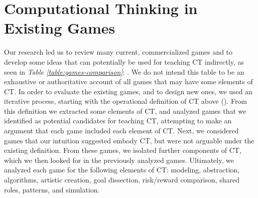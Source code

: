 \documentclass{acm_proc_article-sp}
\begin{document}
\section{Computational Thinking in Existing Games}
\label{sec:CT_current_games}
Our research led us to review many current, commercialized games and to develop some ideas that can potentially be used for teaching CT indirectly, as seen in \textit{Table \ref{table:games-comparison}}: \textit{}.
We do not intend this table to be an exhaustive or authoritative account of all games that may have some elements of CT.
In order to evaluate the existing games, and to design new ones, we used an iterative process, starting with the operational definition of CT above (\cite{operationalct}).
From this definition we extracted some elements of CT, and analyzed games that we identified as potential candidates for teaching CT, attempting to make an argument that each game included each element of CT.
Next, we considered games that our intuition suggested embody CT, but were not arguable under the existing definition.
From these games, we isolated further components of CT, which we then looked for in the previously analyzed games.
Ultimately, we analyzed each game for the following elements of CT: modeling, abstraction, algorithms, artistic creation, goal dissection, risk/reward comparison, shared roles, patterns, and simulation.
\end{document}
